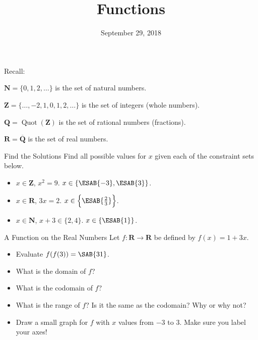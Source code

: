 \documentclass[12pt,letterpaper]{article}
\title{Functions}
\date{September 29, 2018}
\begin{document}
\thispagestyle{empty}

\maketitle

\noindent Recall:

\noindent
\(\mathbf{N} = \{0, 1, 2, \dots\}\) is the set of natural numbers.

\noindent
\(\mathbf{Z} = \{\dots, -2, 1, 0, 1, 2, \dots\}\) is the set of integers (whole numbers).

\noindent
\(\mathbf{Q} = \operatorname{Quot}(\mathbf{Z})\) is the set of rational numbers (fractions).

\noindent
\(\mathbf{R} = \overline{\mathbf{Q}}\) is the set of real numbers.

\begin{problem}{Find the Solutions}
  Find all possible values for \(x\) given each of the constraint sets below.

  \begin{itemize}
    \item \(x \in \mathbf{Z}\), \(x^2 = 9\). \hfill \(x \in \{\ESAB{-3}, \ESAB{3}\}\).
    \item \(x \in \mathbf{R}\), \(3x = 2\). \hfill \(x \in \Big\{\ESAB{\frac{2}{3}}\Big\}\).
    \item \(x \in \mathbf{N}\), \(x + 3 \in \{2, 4\}\). \hfill \(x \in \{\ESAB{1}\}\).
  \end{itemize}
\end{problem}

\begin{problem}{A Function on the Real Numbers}
  Let \(f: \mathbf{R} \to \mathbf{R}\) be defined by \(f(x) = 1 + 3x\).

  \begin{itemize}
    \item Evaluate \(f(f(3)) = \SAB{31}\).
    \item What is the domain of \(f\)? \hfill {}
    \item What is the codomain of \(f\)? \hfill {}
    \item What is the range of \(f\)? Is it the same as the codomain? Why or why not?
    \item Draw a small graph for \(f\) with \(x\) values from \(-3\) to \(3\). Make sure you
    label your axes!
  \end{itemize}
\end{problem}
\end{document}
